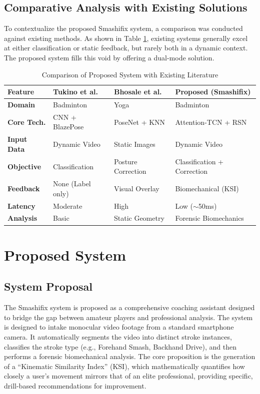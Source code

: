 \documentclass[pdflatex,sn-mathphys-num]{sn-jnl}%
\theoremstyle{thmstyleone}%
\theoremstyle{thmstyletwo}%
\theoremstyle{thmstylethree}%
\begin{document}
\subsection{Comparative Analysis with Existing Solutions}
To contextualize the proposed Smashifix system, a comparison was conducted against existing methods. As shown in Table \ref{tab_lit_compare}, existing systems generally excel at either classification or static feedback, but rarely both in a dynamic context. The proposed system fills this void by offering a dual-mode solution.

\begin{table}[h!]
\caption{Comparison of Proposed System with Existing Literature}\label{tab_lit_compare}
\centering
\small
\setlength{\tabcolsep}{4pt}
\renewcommand{\arraystretch}{1.2}
\begin{tabular}{|l|l|l|l|}
\hline
\textbf{Feature} & \textbf{Tukino et al. \cite{b17}} & \textbf{Bhosale et al. \cite{b32}} & \textbf{Proposed (Smashifix)} \\
\hline
\textbf{Domain} & Badminton & Yoga & Badminton \\
\hline
\textbf{Core Tech.} & CNN + BlazePose & PoseNet + KNN & Attention-TCN + RSN \\
\hline
\textbf{Input Data} & Dynamic Video & Static Images & Dynamic Video \\
\hline
\textbf{Objective} & Classification & Posture Correction & Classification + Correction \\
\hline
\textbf{Feedback} & None (Label only) & Visual Overlay & Biomechanical (KSI) \\
\hline
\textbf{Latency} & Moderate & High & Low ($\sim$50ms) \\
\hline
\textbf{Analysis} & Basic & Static Geometry & Forensic Biomechanics \\
\hline
\end{tabular}
\end{table}


\section{Proposed System}\label{sec3}

\subsection{System Proposal}
The Smashifix system is proposed as a comprehensive coaching assistant designed to bridge the gap between amateur players and professional analysis. The system is designed to intake monocular video footage from a standard smartphone camera. It automatically segments the video into distinct stroke instances, classifies the stroke type (e.g., Forehand Smash, Backhand Drive), and then performs a forensic biomechanical analysis. The core proposition is the generation of a ``Kinematic Similarity Index'' (KSI), which mathematically quantifies how closely a user's movement mirrors that of an elite professional, providing specific, drill-based recommendations for improvement.
\end{document}
